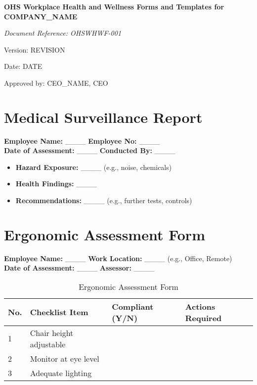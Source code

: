 \documentclass[12pt]{article}
\begin{document}
\begin{titlepage}
    \centering
    \vspace*{2cm}
    {\LARGE\bfseries OHS Workplace Health and Wellness Forms and Templates for {{COMPANY_NAME}}\par}
    \vspace{1cm}
    {\large\itshape Document Reference: OHSWHWF-001\par}
    \vspace{0.5cm}
    {\normalsize Version: {{REVISION}}\par}
    \vspace{0.5cm}
    {\normalsize Date: {{DATE}}\par}
    \vspace{2cm}
    {\normalsize Approved by: {{CEO_NAME}}, CEO\par}
\end{titlepage}

\section{Medical Surveillance Report}

\textbf{Employee Name:} \_\_\_\_ \textbf{Employee No:} \_\_\_\_\\
\textbf{Date of Assessment:} \_\_\_\_ \textbf{Conducted By:} \_\_\_\_

\begin{itemize}
    \item \textbf{Hazard Exposure:} \_\_\_\_ (e.g., noise, chemicals)
    \item \textbf{Health Findings:} \_\_\_\_
    \item \textbf{Recommendations:} \_\_\_\_ (e.g., further tests, controls)
\end{itemize}

\section{Ergonomic Assessment Form}

\textbf{Employee Name:} \_\_\_\_ \textbf{Work Location:} \_\_\_\_ (e.g., Office, Remote)\\
\textbf{Date of Assessment:} \_\_\_\_ \textbf{Assessor:} \_\_\_\_

\begin{table}[h]
    \centering
    \begin{tabular}{p{1cm}p{5cm}p{2cm}p{3cm}}
        \toprule
        \textbf{No.} & \textbf{Checklist Item} & \textbf{Compliant (Y/N)} & \textbf{Actions Required} \\
        \midrule
        1 & Chair height adjustable & & \\
        2 & Monitor at eye level & & \\
        3 & Adequate lighting & & \\
        \bottomrule
    \end{tabular}
    \caption{Ergonomic Assessment Form}
\end{table}
\end{document}
